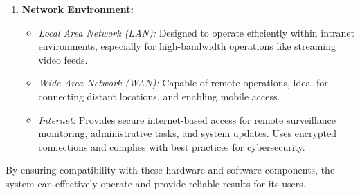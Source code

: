 \documentclass{scrreprt}
\begin{document}
\begin{enumerate}
\begin{itemize}
                \end{itemize}
            \item \textbf{Network Environment: }
                \begin{itemize}
                    \item \textit{Local Area Network (LAN):} Designed to operate efficiently within intranet environments, especially for high-bandwidth operations like streaming video feeds.
                    \item \textit{Wide Area Network (WAN):} Capable of remote operations, ideal for connecting distant locations, and enabling mobile access.
                    \item \textit{Internet:} Provides secure internet-based access for remote surveillance monitoring, administrative tasks, and system updates. Uses encrypted connections and complies with best practices for cybersecurity.
                \end{itemize}
        \end{enumerate}
        By ensuring compatibility with these hardware and software components, the system can effectively operate and provide reliable results for its users.
    
    
\end{document}
